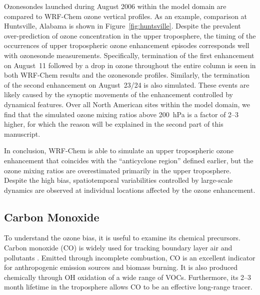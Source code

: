 Ozonesondes launched during August 2006 within the model domain are compared
to WRF-Chem ozone vertical profiles. As an example, comparison at Huntsville, Alabama
is shown in Figure~\ref{fig:huntsville}. Despite the prevalent over-prediction of ozone
concentration in the upper troposphere, the timing of the occurrences of upper
tropospheric ozone enhancement episodes corresponds well with ozonesonde
measurements. Specifically, termination of the first enhancement on August~11
followed by a drop in ozone throughout the entire column is seen in both WRF-Chem
results and the ozonesonde profiles. Similarly, the termination of the second
enhancement on August~23/24  is also simulated. These events are likely caused by
the synoptic movements of the enhancement controlled by dynamical features. Over
all North American sites within the model domain, we find that the simulated ozone
mixing ratios above 200~hPa is a factor of 2--3 higher, for which the reason will
be explained in the second part of this manuscript.

In conclusion, WRF-Chem is able to simulate an upper tropospheric ozone enhancement
that coincides with the ``anticyclone region'' defined earlier, but the ozone mixing ratios
are overestimated primarily in the upper troposphere. Despite the high bias,
spatiotemporal variabilities controlled by large-scale dynamics are observed at individual
locations affected by the ozone enhancement.

\subsection{Carbon Monoxide}\label{sect:val/co}

To understand the ozone bias, it is useful to examine its chemical precursors. Carbon
monoxide (CO) is widely used for tracking boundary layer air and pollutants
\citep[e.g.][]{Pan:2007sw,Weinstock:2007yj}. Emitted through incomplete
combustion, CO  is an excellent indicator for anthropogenic emission sources and
biomass burning. It is also produced chemically through OH oxidation of a wide range
of VOCs. Furthermore, its 2--3 month lifetime in the troposphere allows CO to be an
effective long-range tracer.


